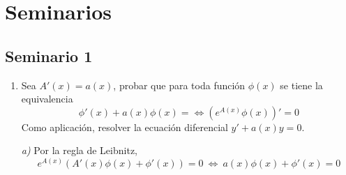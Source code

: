 \chapter{Seminarios}
\section{Seminario 1}
\begin{enumerate}
    \item Sea $A'(x)=a(x)$, probar que para toda función $\phi(x)$ se tiene la equivalencia
    $$\phi'(x)+a(x)\phi(x)= \iff \left(e^{A(x)}\phi(x) \right)'=0 $$
    Como aplicación, resolver la ecuación diferencial $y' + a(x)y = 0$.
    \begin{sol}
    
        \textit{a)} Por la regla de Leibnitz, $$e^{A(x)}(A'(x)\phi(x)+\phi'(x))=0 \: \iff \: a(x)\phi(x)+\phi'(x)=0$$
        

\end{sol}
\end{enumerate}
